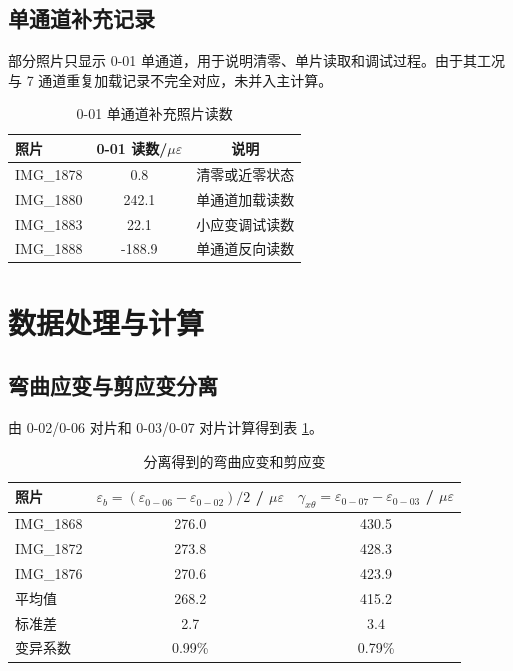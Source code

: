 \documentclass[UTF8,a4paper,10pt]{ctexart}
\newcommand{\ue}{\mu\varepsilon}
\begin{document}
\subsection{单通道补充记录}

部分照片只显示 0-01 单通道，用于说明清零、单片读取和调试过程。由于其工况与 7 通道重复加载记录不完全对应，未并入主计算。

\begin{table}[H]
    \centering
    \caption{0-01 单通道补充照片读数}
    \begin{tabular}{lcc}
        \toprule
        照片 & 0-01 读数/$\ue$ & 说明 \\
        \midrule
        IMG\_1878 & 0.8 & 清零或近零状态 \\
        IMG\_1880 & 242.1 & 单通道加载读数 \\
        IMG\_1883 & 22.1 & 小应变调试读数 \\
        IMG\_1888 & -188.9 & 单通道反向读数 \\
        \bottomrule
    \end{tabular}
\end{table}

\section{数据处理与计算}

\subsection{弯曲应变与剪应变分离}

由 0-02/0-06 对片和 0-03/0-07 对片计算得到表 \ref{tab:derived-strain}。

\begin{table}[H]
    \centering
    \caption{分离得到的弯曲应变和剪应变}
    \label{tab:derived-strain}
    \begin{tabular}{lcc}
        \toprule
        照片 & $\varepsilon_b=(\varepsilon_{0-06}-\varepsilon_{0-02})/2$ / $\ue$
             & $\gamma_{x\theta}=\varepsilon_{0-07}-\varepsilon_{0-03}$ / $\ue$ \\
        \midrule
        IMG\_1868 & 276.0 & 430.5 \\
        IMG\_1872 & 273.8 & 428.3 \\
        IMG\_1876 & 270.6 & 423.9 \\
        \midrule
        平均值 & 268.2 & 415.2 \\
        标准差 & 2.7 & 3.4 \\
        变异系数 & 0.99\% & 0.79\% \\
        \bottomrule
    \end{tabular}
\end{table}
\end{document}

